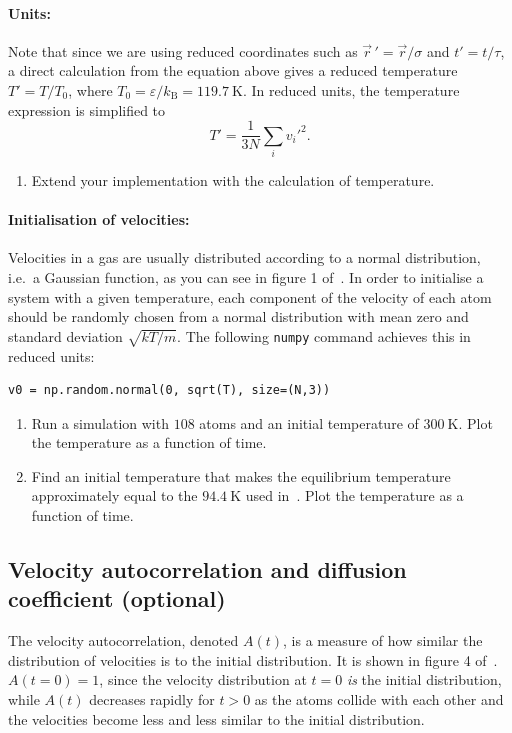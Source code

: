 \documentclass[11pt,british,a4paper]{report}
\begin{document}
\paragraph{Units:} Note that since we are using reduced coordinates such as \(\vec{r}\,'=\vec{r}/\sigma\) and \(t'=t/\tau\), a direct calculation from the equation above gives a reduced temperature \(T'=T/T_0\), where \(T_0 = \varepsilon/k_\mathrm{B}=\SI{119.7}{\kelvin}\). In reduced units, the temperature expression is simplified to
\[
    T' = \frac{1}{3N}\sum_i v_i'^2.
\]
\begin{enumerate}[label=\roman*.]
    \item Extend your implementation with the calculation of temperature.
\end{enumerate}

\paragraph{Initialisation of velocities:} Velocities in a gas are usually distributed according to a normal distribution, i.e.~a Gaussian function, as you can see in figure 1 of~\cite{Rahman_1964}. In order to initialise a system with a given temperature, each component of the velocity of each atom should be randomly chosen from a normal distribution with mean zero and standard deviation \(\sqrt{kT/m}\). The following \texttt{numpy} command achieves this in reduced units:
\begin{lstlisting}
v0 = np.random.normal(0, sqrt(T), size=(N,3))
\end{lstlisting}

\begin{enumerate}[label=\roman*.,resume]
    \item Run a simulation with \(108\) atoms and an initial temperature of \(\SI{300}{\kelvin}\). Plot the temperature as a function of time.
    \item Find an initial temperature that makes the equilibrium temperature approximately equal to the \(\SI{94.4}{\kelvin}\) used in~\cite{Rahman_1964}. Plot the temperature as a function of time.
\end{enumerate}

\subsection{Velocity autocorrelation and diffusion coefficient (optional)}
The velocity autocorrelation, denoted \(A(t)\), is a measure of how similar the distribution of velocities is to the initial distribution. It is shown in figure 4 of~\cite{Rahman_1964}. \(A(t=0)=1\), since the velocity distribution at \(t=0\) \emph{is} the initial distribution, while \(A(t)\) decreases rapidly for \(t>0\) as the atoms collide with each other and the velocities become less and less similar to the initial distribution.
\end{document}
